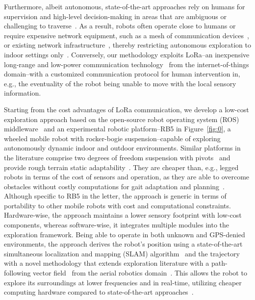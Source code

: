 \documentclass[lettersize,journal]{IEEEtran}
\theoremstyle{definition}
\begin{document}
\IEEEpubidadjcol
Furthermore, albeit autonomous, state-of-the-art approaches rely on humans for supervision and high-level decision-making in areas that are ambiguous or challenging to traverse~\cite{tranzatto2022cerberus,roucek2020darpa,tabib2022autonomous}. 
As a result, robots often operate close to humans or require expensive network equipment, such as a mesh of communication devices~\cite{tranzatto2022cerberus,kulkarni2022autonomous,ebadi2020lamp}, or existing network infrastructure~\cite{khairuldanial2019mobile,baek2022ros,voigtlander20175g}, thereby restricting autonomous exploration to indoor settings only~\cite{delgado2022oros,cadena2016past,eldemiry2022autonomous,corah2019communication,papachristos2017uncertainty}.
Conversely, our methodology exploits LoRa--an inexpensive long-range and low-power communication technology~\cite{shanmuga2020survey} from the internet-of-things domain--with a customized communication protocol 
for human intervention in, e.g., the eventuality of the robot being unable to move with the local sensory information. 

Starting from the cost advantages of LoRa communication, we develop a low-cost %
exploration approach based on the open-source robot operating system (ROS) middleware~\cite{quigley2009ros} and an experimental robotic platform--RB5 in Figure~\ref{fig:0}, a wheeled mobile robot with rocker-bogie suspension--capable of exploring autonomously dynamic indoor and outdoor environments.
Similar platforms in the literature comprise two degrees of freedom suspension with pivots~\cite{setterfield2013terrain,mann2005dynamic,faisal2021low} and provide rough terrain static adaptability~\cite{kim2012optimal}. They are cheaper than, e.g., legged robots in terms of the cost of sensors %
and operation, as they are able to overcome obstacles without costly computations for gait adaptation and planning~\cite{muller2021openbot}.
Although specific to RB5 in the letter, the approach is generic in terms of portability to other mobile robots with cost and computational constraints.
%
Hardware-wise, the approach maintains a lower sensory footprint with low-cost components, whereas 
software-wise, it integrates multiple modules into the exploration framework. Being able to operate in both unknown and GPS-denied environments, the approach derives the robot's position using a state-of-the-art simultaneous localization and mapping (SLAM) algorithm~\cite{labbe2019rtab} %
and the trajectory with a novel methodology that extends exploration literature with a path-following vector field~\cite{goncalves2010vector} from the aerial robotics domain~\cite{seewald2022energy,garcia2017guidance,seewaldphdthesis}. This allows the robot to explore its surroundings at lower frequencies and in real-time, utilizing cheaper computing hardware compared to state-of-the-art approaches~\cite{placed2022survey,tabib2022autonomous,ebadi2020lamp,dang2019graph}. 
\end{document}
